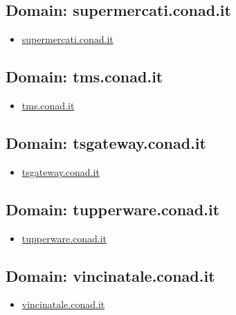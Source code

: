 \documentclass{article}
\begin{document}
    \subsection{Domain: supermercati.conad.it}
    \begin{itemize}
        
            
            \item \href{ http://supermercati.conad.it/}{ supermercati.conad.it }
            
        
    \end{itemize}

    \subsection{Domain: tms.conad.it}
    \begin{itemize}
        
            
            \item \href{ https://tms.conad.it/core/framework/login.cfm}{ tms.conad.it }
            
        
    \end{itemize}

    \subsection{Domain: tsgateway.conad.it}
    \begin{itemize}
        
            
            \item \href{ https://tsgateway.conad.it/RDWeb/Pages/en-US/login.aspx?ReturnUrl=/RDWeb/Pages/en-US/Default.aspx}{ tsgateway.conad.it }
            
        
    \end{itemize}

    \subsection{Domain: tupperware.conad.it}
    \begin{itemize}
        
            
            \item \href{ https://tupperware.conad.it/}{ tupperware.conad.it }
            
        
    \end{itemize}

    \subsection{Domain: vincinatale.conad.it}
    \begin{itemize}
        
            
            \item \href{ https://my.conad.it/login.html?cb=https:/vincinatale.conad.it}{ vincinatale.conad.it }
            
        
    \end{itemize}
\end{document}
